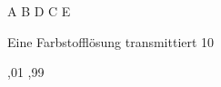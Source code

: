 \documentclass[11pt]{exam}
\begin{document}
\begin{questions}
\begin{choices}
	\choice A
	\choice B
	\choice D
	\choice C
	\choice E
\end{choices}

\vspace{3mm}\question Eine Farbstofflösung transmittiert 10 %

\begin{choices}
	,01
	,99
\end{choices}

\vspace{3mm}\end{questions}
\end{document}

